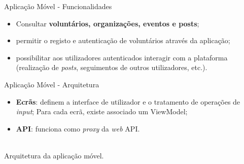\begin{frame}{Aplicação Móvel - Funcionalidades}

\vspace*{-3em}

\begin{itemize}
	\item Consultar \textbf{voluntários, organizações, eventos e posts};
	\item permitir o registo e autenticação de voluntários através da aplicação;
	\item possibilitar aos utilizadores autenticados interagir com a plataforma (realização de \textit{posts}, seguimentos de outros utilizadores, etc.).
\end{itemize}

\end{frame}

\begin{frame}{Aplicação Móvel - Arquitetura}
	
\vspace*{-4em}
	
\begin{itemize}
	\item \textbf{Ecrãs}: definem a interface de utilizador e o tratamento de operações de \textit{input}; Para cada ecrã, existe associado um ViewModel;
	\item \textbf{API}: funciona como \textit{proxy} da \textit{web} API.
\end{itemize}	

\centering
{}\\

{\small Arquitetura da aplicação móvel.}

\end{frame}